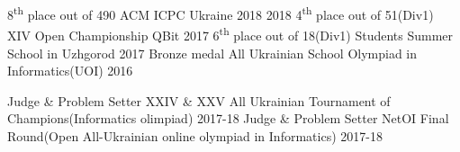 




\begin{cvhonors}
  \cvhonor
    {8\textsuperscript{th} place out of 490}
    {ACM ICPC Ukraine 2018}
    {}
    {2018}
  \cvhonor
    {4\textsuperscript{th} place out of 51(Div1)}
    {XIV Open Championship QBit}
    {}
    {2017}
  \cvhonor
    {6\textsuperscript{th} place out of 18(Div1)}
    {Students Summer School in Uzhgorod}
    {}
    {2017}
  \cvhonor
    {Bronze medal}
    {All Ukrainian School Olympiad in Informatics(UOI)}
    {}
    {2016}
\end{cvhonors}

\begin{cvhonors}
  \cvhonor
    {Judge \& Problem Setter}
    {XXIV \& XXV All Ukrainian Tournament of Champions(Informatics olimpiad)}
    {}
    {2017-18}
  \cvhonor
    {Judge \& Problem Setter}
    {NetOI Final Round(Open All-Ukrainian online olympiad in Informatics)}
    {}
    {2017-18}
\end{cvhonors}
